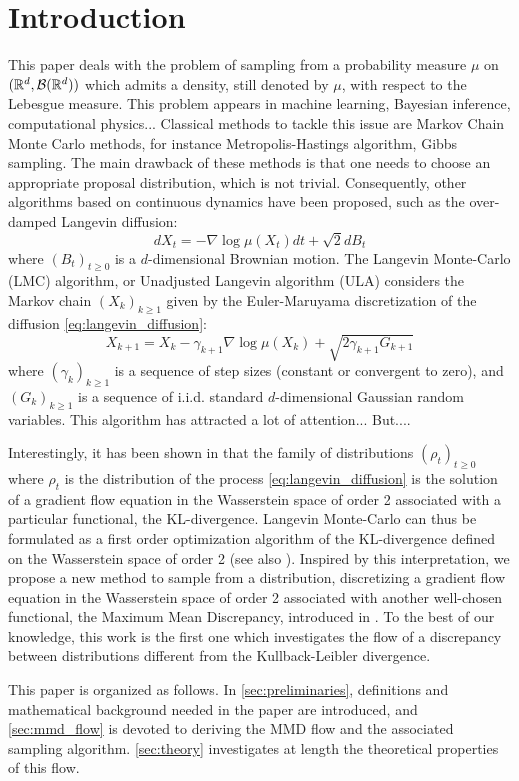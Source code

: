 
\section{Introduction}

This paper deals with the problem of sampling from a probability measure $\mu$ on $({{\mathbb R}}^d,\mathcal{B}({{\mathbb R}}^d))$ which admits a density, still denoted by $\mu$, with respect to the Lebesgue measure.
This problem appears in machine learning, Bayesian inference, computational physics... Classical methods to tackle this issue are Markov Chain Monte Carlo methods, for instance Metropolis-Hastings algorithm, Gibbs sampling. The main drawback of these methods is that one needs to choose an appropriate proposal distribution, which is not trivial. Consequently, other algorithms based on continuous dynamics have been proposed, such as the over-damped Langevin diffusion:
\begin{equation}\label{eq:langevin_diffusion}
dX_t= -\nabla \log \mu (X_t)dt+\sqrt{2}dB_t
\end{equation}
where $(B_t)_{t\ge0}$ is a $d$-dimensional Brownian motion. The Langevin Monte-Carlo (LMC) algorithm, or Unadjusted Langevin algorithm (ULA) considers the Markov chain $(X_k)_{k\ge1 }$ given by the Euler-Maruyama discretization of the diffusion \eqref{eq:langevin_diffusion}:
\begin{equation}\label{eq:langevin_algorithm}
X_{k+1} = X_k - \gamma_{k+1}\nabla \log \mu(X_k) + \sqrt{2\gamma_{k+1}G_{k+1}}
\end{equation}
where $(\gamma_k)_{k\ge1}$ is a sequence of step sizes (constant or convergent to zero), and
$(G_k)_{k \ge 1}$ is a sequence of i.i.d. standard $d$-dimensional Gaussian random variables. This algorithm has attracted a lot of attention... But....

Interestingly, it has been shown in \cite{jordan1998variational} that the family of distributions $(\rho_t)_{t\ge 0}$ where $\rho_t$ is the distribution of the process \eqref{eq:langevin_diffusion} is the solution of a gradient
flow equation in the Wasserstein space of order 2 associated with a particular functional, the KL-divergence. Langevin Monte-Carlo can thus be formulated as a first order optimization algorithm of the KL-divergence defined on the Wasserstein space of order 2 (see also \cite{durmus2018analysis,bernton2018langevin}). Inspired by this interpretation, we propose a new method to sample from a distribution, discretizing a gradient
flow equation in the Wasserstein space of order 2 associated with another well-chosen functional, the Maximum Mean Discrepancy, introduced in \cite{gretton2012kernel}. To the best of our knowledge, this work is the first one which investigates the flow of a discrepancy between distributions different from the Kullback-Leibler divergence. 


This paper is organized as follows. In \cref{sec:preliminaries}, definitions and mathematical background needed in the paper are introduced, and \cref{sec:mmd_flow} is devoted to deriving the MMD flow and the associated sampling algorithm.
\cref{sec:theory} investigates at length the theoretical properties of this flow. 